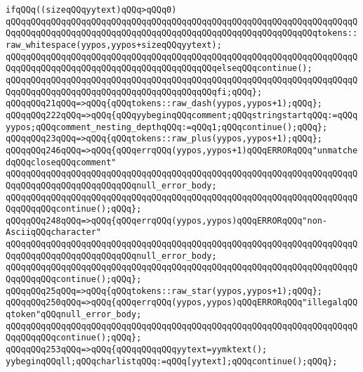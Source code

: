 \verb|ifqQQq((sizeqQQqyytext)qQQq>qQQq0)|\newline
\verb|qQQqqQQqqQQqqQQqqQQqqQQqqQQqqQQqqQQqqQQqqQQqqQQqqQQqqQQqqQQqqQQqqQQqqQQqqQQqqQQqqQQqqQQqqQQqqQQqqQQqqQQqqQQqqQQqqQQqqQQqqQQqqQQqqQQqtokens::raw_whitespace(yypos,yypos+sizeqQQqyytext);|\newline
\verb|qQQqqQQqqQQqqQQqqQQqqQQqqQQqqQQqqQQqqQQqqQQqqQQqqQQqqQQqqQQqqQQqqQQqqQQqqQQqqQQqqQQqqQQqqQQqqQQqqQQqqQQqqQQqqQQqelseqQQqcontinue();|\newline
\verb|qQQqqQQqqQQqqQQqqQQqqQQqqQQqqQQqqQQqqQQqqQQqqQQqqQQqqQQqqQQqqQQqqQQqqQQqqQQqqQQqqQQqqQQqqQQqqQQqqQQqqQQqqQQqqQQqfi;qQQq};|\newline
\verb|qQQqqQQq21qQQq=>qQQq{qQQqtokens::raw_dash(yypos,yypos+1);qQQq};|\newline
\verb|qQQqqQQq222qQQq=>qQQq{qQQqyybeginqQQqcomment;qQQqstringstartqQQq:=qQQqyypos;qQQqcomment_nesting_depthqQQq:=qQQq1;qQQqcontinue();qQQq};|\newline
\verb|qQQqqQQq23qQQq=>qQQq{qQQqtokens::raw_plus(yypos,yypos+1);qQQq};|\newline
\verb|qQQqqQQq246qQQq=>qQQq{qQQqerrqQQq(yypos,yypos+1)qQQqERRORqQQq"unmatchedqQQqcloseqQQqcomment"|\newline
\verb|qQQqqQQqqQQqqQQqqQQqqQQqqQQqqQQqqQQqqQQqqQQqqQQqqQQqqQQqqQQqqQQqqQQqqQQqqQQqqQQqqQQqqQQqqQQqqQQqnull_error_body;|\newline
\verb|qQQqqQQqqQQqqQQqqQQqqQQqqQQqqQQqqQQqqQQqqQQqqQQqqQQqqQQqqQQqqQQqqQQqqQQqqQQqqQQqcontinue();qQQq};|\newline
\verb|qQQqqQQq248qQQq=>qQQq{qQQqerrqQQq(yypos,yypos)qQQqERRORqQQq"non-AsciiqQQqcharacter"|\newline
\verb|qQQqqQQqqQQqqQQqqQQqqQQqqQQqqQQqqQQqqQQqqQQqqQQqqQQqqQQqqQQqqQQqqQQqqQQqqQQqqQQqqQQqqQQqqQQqqQQqnull_error_body;|\newline
\verb|qQQqqQQqqQQqqQQqqQQqqQQqqQQqqQQqqQQqqQQqqQQqqQQqqQQqqQQqqQQqqQQqqQQqqQQqqQQqqQQqcontinue();qQQq};|\newline
\verb|qQQqqQQq25qQQq=>qQQq{qQQqtokens::raw_star(yypos,yypos+1);qQQq};|\newline
\verb|qQQqqQQq250qQQq=>qQQq{qQQqerrqQQq(yypos,yypos)qQQqERRORqQQq"illegalqQQqtoken"qQQqnull_error_body;|\newline
\verb|qQQqqQQqqQQqqQQqqQQqqQQqqQQqqQQqqQQqqQQqqQQqqQQqqQQqqQQqqQQqqQQqqQQqqQQqqQQqqQQqcontinue();qQQq};|\newline
\verb|qQQqqQQq253qQQq=>qQQq{qQQqqQQqqQQqyytext=yymktext();|\newline
\verb|yybeginqQQqll;qQQqcharlistqQQq:=qQQq[yytext];qQQqcontinue();qQQq};|\newline
